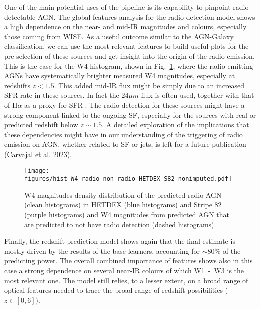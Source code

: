 \documentclass{aa}
\begin{document}
One of the main potential uses of the pipeline is its capability to pinpoint radio detectable AGN. The global features analysis for the radio detection model shows a high dependence on the near- and mid-IR magnitudes and colours, especially those coming from WISE. As a useful outcome similar to the AGN-Galaxy classification, we can use the most relevant features to build useful plots for the pre-selection of these sources and get insight into the origin of the radio emission. This is the case for the W4 histogram, shown in Fig.~\ref{fig:hist_W4_nonimputed_pred_radio_non_radio_AGN}, where the radio-emitting AGNs have systematically brighter measured W4 magnitudes, especially at redshifts ${z < 1.5}$. This added mid-IR flux might be simply due to an increased SFR rate in these sources. In fact the $24\mu m$ flux is often used, together with that of H$\alpha$ as a proxy for SFR \citep{2009ApJ...703.1672K}. The radio detection for these sources might have a strong component linked to the ongoing SF, especially for the sources with real or predicted redshift below ${z {\sim} 1.5}$. A detailed exploration of the implications that these dependencies might have in our understanding of the triggering of radio emission on AGN, whether related to SF or jets, is left for a future publication (Carvajal et al. 2023).


\begin{figure}
  \centering
    \texttt{[image: figures/hist\_W4\_radio\_non\_radio\_HETDEX\_S82\_nonimputed.pdf]}
  \caption{W4 magnitudes density distribution of the predicted radio-AGN  (clean histograms) in HETDEX (blue histograms) and Stripe 82 (purple histograms) and W4 magnitudes from predicted AGN that are predicted to not have radio detection (dashed histograms).}
  \label{fig:hist_W4_nonimputed_pred_radio_non_radio_AGN}
\end{figure}

Finally, the redshift prediction model shows again that the final estimate is mostly driven by the results of the base learners, accounting for ${\sim} 80\%$ of the predicting power. The overall combined importance of features shows also in this case a strong dependence on several near-IR colours of which W1~-~W3 is the most relevant one. 
The model still relies, to a lesser extent, on a broad range of optical features needed to trace the broad range of redshift possibilities ($z \in [0,6]$).%
\end{document}
